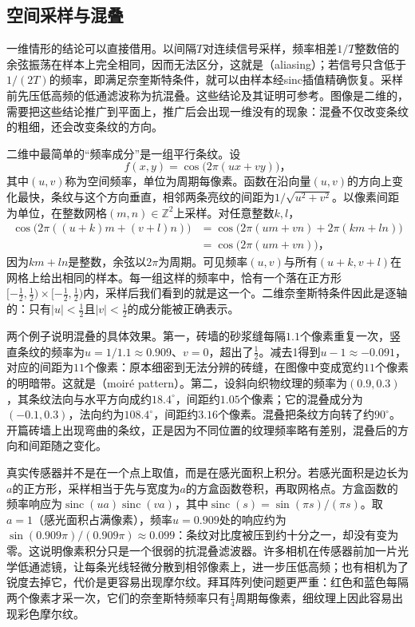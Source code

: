 \subsection{空间采样与混叠}
\label{sec:vision-formation-aliasing}

一维情形的结论可以直接借用。以间隔$T$对连续信号采样，频率相差$1/T$整数倍的余弦振荡在样本上完全相同，因而无法区分，这就是（aliasing）；若信号只含低于$1/(2T)$的频率，即满足奈奎斯特条件，就可以由样本经sinc插值精确恢复。采样前先压低高频的低通滤波称为抗混叠。这些结论及其证明可参考。图像是二维的，需要把这些结论推广到平面上，推广后会出现一维没有的现象：混叠不仅改变条纹的粗细，还会改变条纹的方向。

二维中最简单的“频率成分”是一组平行条纹。设
\[
  f(x,y)=\cos\bigl(2\pi(ux+vy)\bigr)\text{，}
\]
其中$(u,v)$称为空间频率，单位为周期每像素。函数在沿向量$(u,v)$的方向上变化最快，条纹与这个方向垂直，相邻两条亮纹的间距为$1/\sqrt{u^2+v^2}$。以像素间距为单位，在整数网格$(m,n)\in\mathbb{Z}^2$上采样。对任意整数$k,l$，
\[
  \begin{aligned}
    \cos\bigl(2\pi((u+k)m+(v+l)n)\bigr)
    &=\cos\bigl(2\pi(um+vn)+2\pi(km+ln)\bigr)\\
    &=\cos\bigl(2\pi(um+vn)\bigr)\text{，}
  \end{aligned}
\]
因为$km+ln$是整数，余弦以$2\pi$为周期。可见频率$(u,v)$与所有$(u+k,v+l)$在网格上给出相同的样本。每一组这样的频率中，恰有一个落在正方形$[-\tfrac12,\tfrac12)\times[-\tfrac12,\tfrac12)$内，采样后我们看到的就是这一个。二维奈奎斯特条件因此是逐轴的：只有$\lvert u\rvert<\tfrac12$且$\lvert v\rvert<\tfrac12$的成分能被正确表示。

两个例子说明混叠的具体效果。第一，砖墙的砂浆缝每隔$1.1$个像素重复一次，竖直条纹的频率为$u=1/1.1\approx0.909$、$v=0$，超出了$\tfrac12$。减去1得到$u-1\approx-0.091$，对应的间距为$11$个像素：原本细密到无法分辨的砖缝，在图像中变成宽约$11$个像素的明暗带。这就是（moiré pattern）。第二，设斜向织物纹理的频率为$(0.9,0.3)$，其条纹法向与水平方向成约$18.4^\circ$，间距约$1.05$个像素；它的混叠成分为$(-0.1,0.3)$，法向约为$108.4^\circ$，间距约$3.16$个像素。混叠把条纹方向转了约$90^\circ$。开篇砖墙上出现弯曲的条纹，正是因为不同位置的纹理频率略有差别，混叠后的方向和间距随之变化。

真实传感器并不是在一个点上取值，而是在感光面积上积分。若感光面积是边长为$a$的正方形，采样相当于先与宽度为$a$的方盒函数卷积，再取网格点。方盒函数的频率响应为$\operatorname{sinc}(ua)\operatorname{sinc}(va)$，其中$\operatorname{sinc}(s)=\sin(\pi s)/(\pi s)$。取$a=1$（感光面积占满像素），频率$u=0.909$处的响应约为$\sin(0.909\pi)/(0.909\pi)\approx0.099$：条纹对比度被压到约十分之一，却没有变为零。这说明像素积分只是一个很弱的抗混叠滤波器。许多相机在传感器前加一片光学低通滤镜，让每条光线轻微分散到相邻像素上，进一步压低高频；也有相机为了锐度去掉它，代价是更容易出现摩尔纹。拜耳阵列使问题更严重：红色和蓝色每隔两个像素才采一次，它们的奈奎斯特频率只有$\tfrac14$周期每像素，细纹理上因此容易出现彩色摩尔纹。

